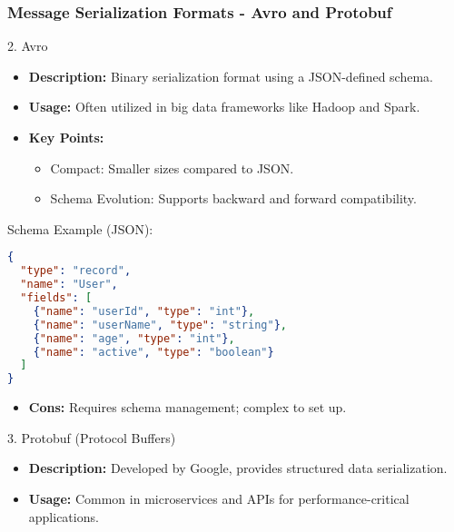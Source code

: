 \documentclass[aspectratio=169]{beamer}
\begin{document}
\begin{frame}[fragile]
    \frametitle{Message Serialization Formats - Avro and Protobuf}
    \begin{block}{2. Avro}
        \begin{itemize}
            \item \textbf{Description:} Binary serialization format using a JSON-defined schema.
            \item \textbf{Usage:} Often utilized in big data frameworks like Hadoop and Spark.
        \end{itemize}
        
        \begin{itemize}
            \item \textbf{Key Points:}
            \begin{itemize}
                \item Compact: Smaller sizes compared to JSON.
                \item Schema Evolution: Supports backward and forward compatibility.
            \end{itemize}
        \end{itemize}
        
        \begin{block}{Schema Example (JSON):}
            \begin{lstlisting}[language=json]
{
  "type": "record",
  "name": "User",
  "fields": [
    {"name": "userId", "type": "int"},
    {"name": "userName", "type": "string"},
    {"name": "age", "type": "int"},
    {"name": "active", "type": "boolean"}
  ]
}
            \end{lstlisting}
        \end{block}
        
        \begin{itemize}
            \item \textbf{Cons:} Requires schema management; complex to set up.
        \end{itemize}
    \end{block}
    
    \begin{block}{3. Protobuf (Protocol Buffers)}
        \begin{itemize}
            \item \textbf{Description:} Developed by Google, provides structured data serialization.
            \item \textbf{Usage:} Common in microservices and APIs for performance-critical applications.
        \end{itemize}
        

\end{block}
\end{frame}
\end{document}
